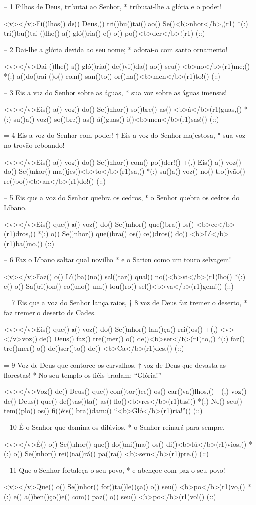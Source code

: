 – 1 Filhos de Deus, tributai ao Senhor, *
tributai-lhe a glória e o poder!

<v></v>Fi()lhos() de() Deus,() tri()bu()tai() ao() Se()<b>nhor</b>,(r1) *(:)
tri()bu()tai-()lhe() a() gló()ria() e() o() po()<b>der</b>!(r1) (::)

– 2 Dai-lhe a glória devida ao seu nome; *
adorai-o com santo ornamento!

<v></v>Dai-()lhe() a() gló()ria() de()vi()da() ao() seu() <b>no</b>(r1)me;() *(:)
a()do()rai-()o() com() san()to() or()na()<b>men</b>(r1)to!() (::)

– 3 Eis a voz do Senhor sobre as águas, *
sua voz sobre as águas imensas!

<v></v>Eis() a() voz() do() Se()nhor() so()bre() as() <b>á</b>(r1)guas,() *(:)
su()a() voz() so()bre() as() á()guas() i()<b>men</b>(r1)sas!() (::)

= 4 Eis a voz do Senhor com poder! †
Eis a voz do Senhor majestosa, *
sua voz no trovão reboando!

<v></v>Eis() a() voz() do() Se()nhor() com() po()der!() +(,)
Eis() a() voz() do() Se()nhor() ma()jes()<b>to</b>(r1)sa,() *(:)
su()a() voz() no() tro()vão() re()bo()<b>an</b>(r1)do!() (::)

– 5 Eis que a voz do Senhor quebra os cedros, *
o Senhor quebra os cedros do Líbano.

<v></v>Eis() que() a() voz() do() Se()nhor() que()bra() os() <b>ce</b>(r1)dros,() *(:)
o() Se()nhor() que()bra() os() ce()dros() do() <b>Lí</b>(r1)ba()no.() (::)

– 6 Faz o Líbano saltar qual novilho *
e o Sarion como um touro selvagem!


<v></v>Faz() o() Lí()ba()no() sal()tar() qual() no()<b>vi</b>(r1)lho() *(:)
e() o() Sa()ri()on() co()mo() um() tou()ro() sel()<b>va</b>(r1)gem!() (::)

= 7 Eis que a voz do Senhor lança raios, †
8 voz de Deus faz tremer o deserto, *
faz tremer o deserto de Cades.

<v></v>Eis() que() a() voz() do() Se()nhor() lan()ça() rai()os() +(,)
<v></v>voz() de() Deus() faz() tre()mer() o() de()<b>ser</b>(r1)to,() *(:)
faz() tre()mer() o() de()ser()to() de() <b>Ca</b>(r1)des.() (::)

= 9 Voz de Deus que contorce os carvalhos, †
voz de Deus que devasta as florestas! *
No seu templo os fiéis bradam: “Glória!”

<v></v>Voz() de() Deus() que() con()tor()ce() os() car()va()lhos,() +(,)
voz() de() Deus() que() de()vas()ta() as() flo()<b>res</b>(r1)tas!() *(:)
No() seu() tem()plo() os() fi()éis() bra()dam:() ``<b>Gló</b>(r1)ria!''() (::)


– 10 É o Senhor que domina os dilúvios, *
o Senhor reinará para sempre.

<v></v>É() o() Se()nhor() que() do()mi()na() os() di()<b>lú</b>(r1)vios,() *(:)
o() Se()nhor() rei()na()rá() pa()ra() <b>sem</b>(r1)pre.() (::)

– 11 Que o Senhor fortaleça o seu povo, *
e abençoe com paz o seu povo!

<v></v>Que() o() Se()nhor() for()ta()le()ça() o() seu() <b>po</b>(r1)vo,() *(:)
e() a()ben()ço()e() com() paz() o() seu() <b>po</b>(r1)vo!() (::)